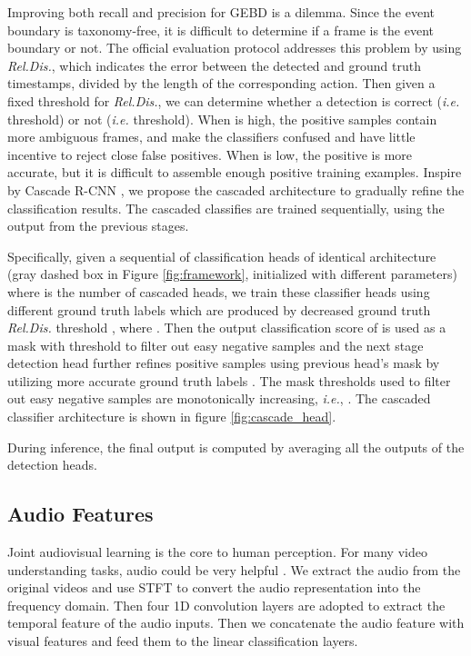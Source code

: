 \documentclass[final]{cvpr}
\begin{document}
Improving both recall and precision for GEBD is a dilemma. Since the event boundary is taxonomy-free, it is difficult to determine if a frame is the event boundary or not. The official evaluation protocol \cite{DBLP:journals/corr/GEBD_dataset} addresses this problem by using \textit{Rel.Dis.}, which indicates the error between the detected and ground truth timestamps, divided by the length of the corresponding action. Then given a fixed threshold  for \textit{Rel.Dis.}, we can determine whether a detection is correct (\textit{i.e.}  threshold) or not (\textit{i.e.}  threshold). When  is high, the positive samples contain more ambiguous frames, and make the classifiers confused and have little incentive to reject close false positives. When  is low, the positive is more accurate, but it is difficult to assemble enough positive training examples. Inspire by Cascade R-CNN \cite{DBLP:conf/cvpr/cascade-rcnn}, we propose the cascaded architecture to gradually refine the classification results. The cascaded classifies are trained sequentially, using the output from the previous stages.

Specifically, given a sequential of classification heads  of identical architecture (gray dashed box in Figure \ref{fig:framework}, initialized with different parameters) where  is the number of cascaded heads, we train these classifier heads using different ground truth labels  which are produced by decreased ground truth \textit{Rel.Dis.} threshold , where . Then the output classification score  of  is used as a mask with threshold  to filter out easy negative samples and the next stage detection head  further refines positive samples using previous head's mask by utilizing more accurate ground truth labels . The mask thresholds  used to filter out easy negative samples are monotonically increasing, \textit{i.e.}, . The cascaded classifier architecture is shown in figure \ref{fig:cascade_head}.

During inference, the final output is computed by averaging all the outputs of the detection heads.

\subsection{Audio Features}
Joint audiovisual learning is the core to human perception. For many video understanding tasks, audio could be very helpful \cite{avslowfast}. We extract the audio from the original videos and use STFT to convert the audio representation into the frequency domain. Then four 1D convolution layers are adopted to extract the temporal feature of the audio inputs. Then we concatenate the audio feature with visual features and feed them to the linear classification layers.
\end{document}
